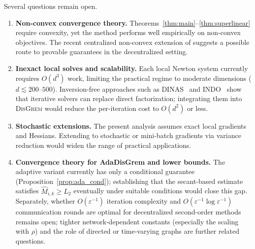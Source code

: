 \documentclass[11pt,a4paper]{article}
\def\cO{O}%
\newcommand{\cO}{\mathcal{O}}
\begin{document}
	Several questions remain open.
	\begin{enumerate}[label=(\roman*),leftmargin=2em,itemsep=3pt]
		\item \textbf{Non-convex convergence theory.}
		Theorems~\ref{thm:main}--\ref{thm:superlinear} require convexity,
		yet the method performs well empirically on non-convex objectives.
		The recent centralized non-convex extension of
		\citet{ding2025nonconvex} suggests a possible route to provable
		guarantees in the decentralized setting.

		\item \textbf{Inexact local solves and scalability.}
		Each local Newton system currently requires $\cO(d^3)$ work,
		limiting the practical regime to moderate dimensions
		($d\lesssim 200$--$500$).
		Inversion-free approaches such as DINAS~\citep{crane2025dinas}
		and INDO~\citep{yuan2023indo} show that iterative
		solvers can replace direct factorization;
		integrating them into \textsc{DisGrem} would reduce the
		per-iteration cost to $\cO(d^2)$ or less.

		\item \textbf{Stochastic extensions.}
		The present analysis assumes exact local gradients and Hessians.
		Extending to stochastic or mini-batch gradients via
		variance reduction would widen the range of practical
		applications.

		\item \textbf{Convergence theory for AdaDisGrem and lower bounds.}
		The adaptive variant currently has only a conditional guarantee
		(Proposition~\ref{prop:ada_cond});
		establishing that the secant-based estimate satisfies
		$\hat M_{i,k}\ge L_2$ eventually under suitable conditions
		would close this gap.
		Separately, whether $\cO(\varepsilon^{-1})$ iteration complexity
		and $\cO(\varepsilon^{-1}\log\varepsilon^{-1})$ communication
		rounds are optimal for decentralized second-order methods remains
		open; tighter network-dependent constants (especially the
		scaling with $\rho$) and the role of directed or time-varying
		graphs are further related questions.
	\end{enumerate}
	
\end{document}
